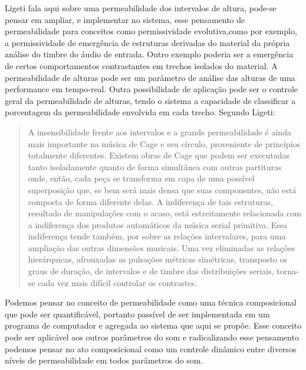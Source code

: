 \documentclass{ppgmus}
\begin{document}
Ligeti fala aqui sobre uma permeabilidade dos intervalos de altura,
pode-se pensar em ampliar, e implementar no sistema, esse pensamento
de permeabilidade para conceitos como permissividade evolutiva,como por
exemplo, a permissividade de emergência de estruturas derivadas do material 
da própria análise do timbre do áudio de entrada. Outro exemplo poderia ser a 
emergência de certos comportamentos contrastantes em trechos isolados do material.
A permeabilidade de alturas pode ser um parâmetro de análise das alturas 
de uma performance em tempo-real. Outra possibilidade de aplicação pode ser o
controle geral da permeabilidade de alturas, tendo o sistema a capacidade de
classificar a porcentagem da permeabilidade envolvida em cada trecho. Segundo
Ligeti: 

\begin{quote}
  A insensibilidade frente aos intervalos e a grande permeabilidade é
  ainda mais importante na música de Cage e seu círculo, proveniente
  de princípios totalmente diferentes. Existem obras de Cage que podem
  ser executadas tanto isoladamente quanto de forma simultânea com
  outras partituras onde, então, cada peça se transforma em capa de
  uma possível superposição que, se bem será mais densa que suas
  componentes, não está composta de forma diferente delas. A
  indiferença de tais estruturas, resultado de manipulações com o
  acaso, está estreitamente relacionada com a indiferença dos produtos
  automáticos da música serial primitiva. Essa indiferença tende
  também, por sobre as relações intervalares, para uma ampliação das
  outras dimensões musicais. Uma vez eliminadas as relações
  hierárquicas, afrouxadas as pulsações métricas simétricas,
  transposto os graus de duração, de intervalos e de timbre das
  distribuições seriais, torna-se cada vez mais difícil controlar os
  contrastes.
\end{quote}

Podemos pensar no conceito de permeabilidade como uma técnica composicional
que pode ser quantificável, portanto passível de ser implementada em um programa
de computador e agregada ao sistema que aqui se propõe. Esse conceito pode ser
aplicável aos outros parâmetros do som e radicalizando esse pensamento podemos
pensar no ato composicional como um controle dinâmico entre diversos níveis de 
permeabilidade em todos parâmetros do som.
\end{document}
